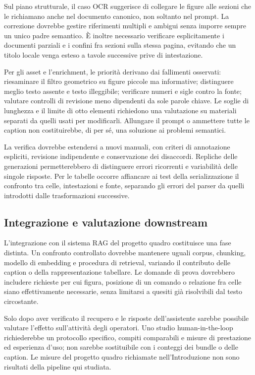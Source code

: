 Sul piano strutturale, il caso OCR suggerisce di collegare le figure alle sezioni che le richiamano anche nel documento canonico, non soltanto nel prompt. La correzione dovrebbe gestire riferimenti multipli e ambigui senza imporre sempre un unico padre semantico. È inoltre necessario verificare esplicitamente i documenti parziali e i confini fra sezioni sulla stessa pagina, evitando che un titolo locale venga esteso a tavole successive prive di intestazione.

Per gli asset e l'enrichment, le priorità derivano dai fallimenti osservati: riesaminare il filtro geometrico su figure piccole ma informative; distinguere meglio testo assente e testo illeggibile; verificare numeri e sigle contro la fonte; valutare controlli di revisione meno dipendenti da sole parole chiave. Le soglie di lunghezza e il limite di otto elementi richiedono una valutazione su materiali separati da quelli usati per modificarli. Allungare il prompt o ammettere tutte le caption non costituirebbe, di per sé, una soluzione ai problemi semantici.

La verifica dovrebbe estendersi a nuovi manuali, con criteri di annotazione espliciti, revisione indipendente e conservazione dei disaccordi. Repliche delle generazioni permetterebbero di distinguere errori ricorrenti e variabilità delle singole risposte. Per le tabelle occorre affiancare ai test della serializzazione il confronto tra celle, intestazioni e fonte, separando gli errori del parser da quelli introdotti dalle trasformazioni successive.

\subsection{Integrazione e valutazione downstream}

L'integrazione con il sistema RAG del progetto quadro costituisce una fase distinta. Un confronto controllato dovrebbe mantenere uguali corpus, chunking, modello di embedding e procedura di retrieval, variando il contributo delle caption o della rappresentazione tabellare. Le domande di prova dovrebbero includere richieste per cui figura, posizione di un comando o relazione fra celle siano effettivamente necessarie, senza limitarsi a quesiti già risolvibili dal testo circostante.

Solo dopo aver verificato il recupero e le risposte dell'assistente sarebbe possibile valutare l'effetto sull'attività degli operatori. Uno studio human-in-the-loop richiederebbe un protocollo specifico, compiti comparabili e misure di prestazione ed esperienza d'uso; non sarebbe sostituibile con i conteggi dei bundle o delle caption. Le misure del progetto quadro richiamate nell'Introduzione non sono risultati della pipeline qui studiata.

